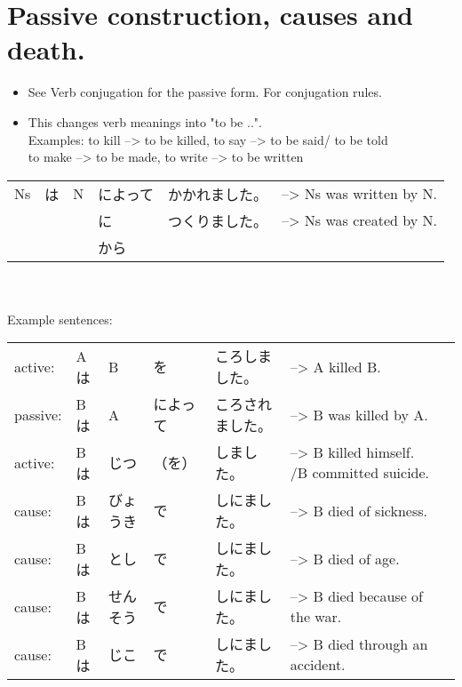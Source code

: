 \documentclass{article}
\begin{document}
\section{Passive construction, causes and death.}
\begin{itemize}
\item See Verb conjugation for the passive form. For conjugation rules.
\item This changes verb meanings into "to be ..". \\
    Examples: to kill --> to be killed, to say --> to be said/ to be told \\
              to make --> to be made, to write --> to be written \\
\end{itemize}
\begin{tabular}{ l | l | l | l | l | l }
Ns & は & N & によって & かかれました。 &--> Ns was written by N. \\
&&&に&つくりました。&--> Ns was created by N. \\
&&&から&& 
\end{tabular} \\
\vspace{2 mm} \\
Example sentences: \\
\begin{tabular}{ l l l l l l | l }
active:&Aは&B&を&ころしました。&--> A killed B. \\ %
passive:&Bは&A&によって&ころされました。&--> B was killed by A. \\ %
active:&Bは&じつ&（を）&しました。&--> B killed himself. /B committed suicide. \\ %
cause:&Bは&びょうき&で&しにました。&--> B died of sickness. \\ %
cause:&Bは&とし&で&しにました。&--> B died of age. \\ %
cause:&Bは&せんそう&で&しにました。&--> B died because of the war. \\ %
cause:&Bは&じこ&で&しにました。&--> B died through an accident. 
\end{tabular}    
\end{document}
